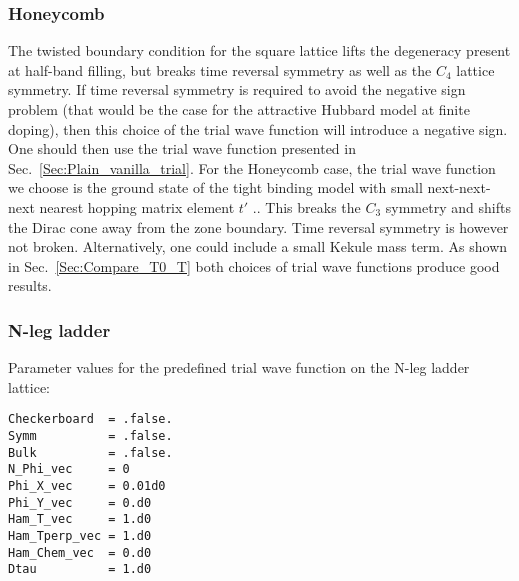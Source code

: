 \subsubsection{Honeycomb}

The   twisted boundary condition  for the square lattice lifts  the degeneracy  present at half-band filling, but breaks time reversal symmetry as well as the $C_4$ lattice symmetry.  If  time reversal  symmetry is  required  to avoid the negative sign problem (that would be the case for the attractive Hubbard model at finite doping), then this choice of the trial  wave function will introduce a negative sign. One should then use the trial wave function presented in Sec.~\ref{Sec:Plain_vanilla_trial}.  For the Honeycomb case,  the trial wave function we choose is the ground state of the tight binding model  with small  next-next-next  nearest hopping matrix element $t'$  \cite{Ixert14}..  This breaks the  $C_3$ symmetry and   shifts the Dirac cone away from the zone boundary.  Time  reversal symmetry is however not broken. Alternatively, one could include a small Kekule mass term.   As shown in Sec.~\ref{Sec:Compare_T0_T}   both choices of  trial wave functions produce good results. 



\subsubsection{N-leg ladder}

Parameter values for the predefined trial wave function on the N-leg ladder lattice:
\begin{lstlisting}[style=fortran]
Checkerboard  = .false.
Symm          = .false.
Bulk          = .false.
N_Phi_vec     = 0
Phi_X_vec     = 0.01d0
Phi_Y_vec     = 0.d0
Ham_T_vec     = 1.d0
Ham_Tperp_vec = 1.d0
Ham_Chem_vec  = 0.d0
Dtau          = 1.d0
\end{lstlisting}


